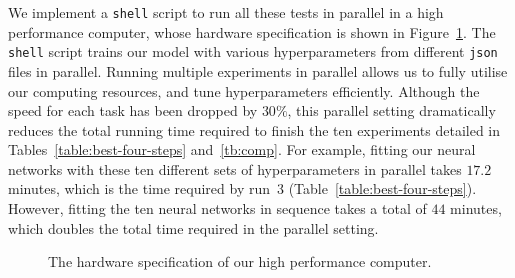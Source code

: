 We implement a \texttt{shell} script to run all these tests in parallel in a high performance computer, whose hardware specification is shown in Figure~\ref{fig:hardware}. The \texttt{shell} script trains our model with various hyperparameters from different 
\texttt{json} files in parallel. 
Running multiple experiments in parallel allows us to fully utilise our computing resources, and tune hyperparameters efficiently. Although the speed for each task has been dropped by $30\%$, this parallel setting dramatically reduces the total running time required to finish the ten experiments detailed in Tables~\ref{table:best-four-steps} and~\ref{tb:comp}. For example, fitting our neural networks with these ten different sets of hyperparameters in parallel takes $17.2$ minutes, which is the time required by run~3 (Table~\ref{table:best-four-steps}). However, fitting the ten neural networks in sequence takes a total of $44$ minutes, which doubles the total time required in the parallel setting.\begin{figure}
    \caption{The hardware specification of our high performance computer.}
    \label{fig:hardware}
\end{figure}


